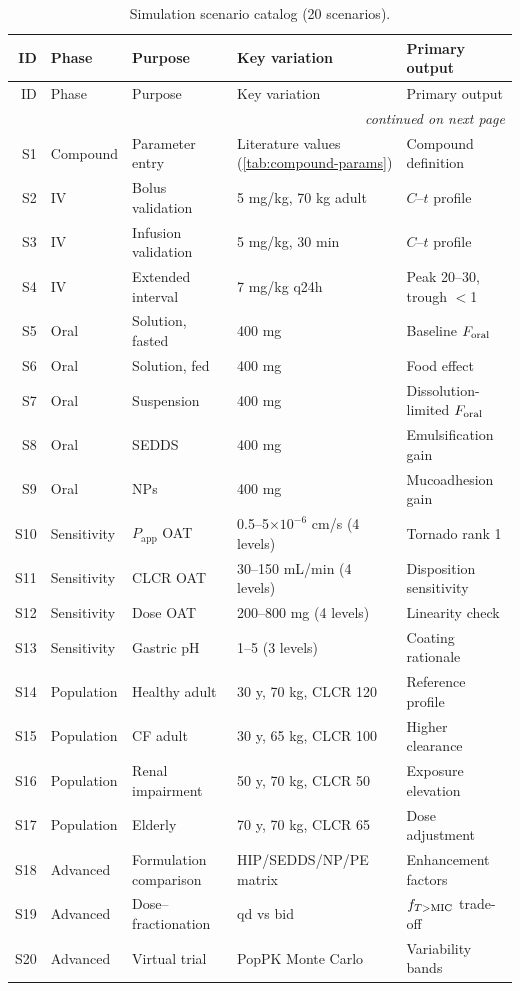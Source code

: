\small\setlength{\tabcolsep}{4pt}
\begin{longtable}{rp{1.6cm}p{3.2cm}p{3.0cm}p{3.2cm}}
\caption{Simulation scenario catalog (20 scenarios).}\label{tab:scenarios}\\
\toprule
ID & Phase & Purpose & Key variation & Primary output\\
\midrule
\endfirsthead
\toprule
ID & Phase & Purpose & Key variation & Primary output\\
\midrule
\endhead
\midrule
\multicolumn{5}{r}{\emph{continued on next page}}\\
\endfoot
\bottomrule
\endlastfoot
S1 & Compound & Parameter entry & Literature values (\cref{tab:compound-params}) & Compound definition\\
S2 & IV & Bolus validation & 5 mg/kg, 70 kg adult & $C$--$t$ profile\\
S3 & IV & Infusion validation & 5 mg/kg, 30 min & $C$--$t$ profile\\
S4 & IV & Extended interval & 7 mg/kg q24h & Peak 20--30, trough $<$1\\
S5 & Oral & Solution, fasted & 400 mg & Baseline $F_{\mathrm{oral}}$\\
S6 & Oral & Solution, fed & 400 mg & Food effect\\
S7 & Oral & Suspension & 400 mg & Dissolution-limited $F_{\mathrm{oral}}$\\
S8 & Oral & SEDDS & 400 mg & Emulsification gain\\
S9 & Oral & NPs & 400 mg & Mucoadhesion gain\\
S10 & Sensitivity & $P_{\mathrm{app}}$ OAT & 0.5--5$\times10^{-6}$ cm/s (4 levels) & Tornado rank 1\\
S11 & Sensitivity & CLCR OAT & 30--150 mL/min (4 levels) & Disposition sensitivity\\
S12 & Sensitivity & Dose OAT & 200--800 mg (4 levels) & Linearity check\\
S13 & Sensitivity & Gastric pH & 1--5 (3 levels) & Coating rationale\\
S14 & Population & Healthy adult & 30 y, 70 kg, CLCR 120 & Reference profile\\
S15 & Population & CF adult & 30 y, 65 kg, CLCR 100 & Higher clearance\\
S16 & Population & Renal impairment & 50 y, 70 kg, CLCR 50 & Exposure elevation\\
S17 & Population & Elderly & 70 y, 70 kg, CLCR 65 & Dose adjustment\\
S18 & Advanced & Formulation comparison & HIP/SEDDS/NP/PE matrix & Enhancement factors\\
S19 & Advanced & Dose--fractionation & qd vs bid & $f_{T>\mathrm{MIC}}$ trade-off\\
S20 & Advanced & Virtual trial & PopPK Monte Carlo & Variability bands\\
\end{longtable}
